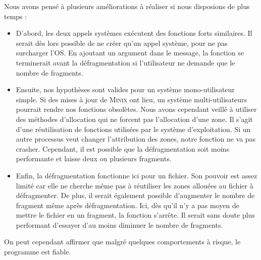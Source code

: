 Nous avons pensé à plusieurs améliorations à réaliser si nous disposions de plus temps : 
\begin{itemize}
\item D'abord, les deux appels systèmes exécutent des fonctions forts similaires. Il serait dès lors possible de ne créer qu'un appel système, pour ne pas surcharger l'OS. En ajoutant un argument dans le message, la fonction se terminerait avant la défragmentation si l'utilisateur ne demande que le nombre de fragments.
\item Ensuite, nos hypothèses sont valides pour un système mono-utilisateur simple. Si des mises à jour de \textsc{Minix} ont lieu, un système multi-utilisateurs pourrait rendre nos fonctions obsolètes. Nous avons cependant veillé à utiliser des méthodes d'allocation qui ne forcent pas l'allocation d'une zone. Il s'agit d'une réutilisation de fonctions utilisées par le système d'exploitation. Si un autre processus veut changer l'attribution des zones, notre fonction ne va pas crasher. Cependant, il est possible que la défragmentation soit moins performante et laisse deux ou plusieurs fragments.
\item Enfin, la défragmentation fonctionne ici pour un fichier. Son pouvoir est assez limité car elle ne cherche même pas à réutiliser les zones allouées au fichier à défragmenter. De plus, il serait également possible d'augmenter le nombre de fragment même après défragmentation. Ici, dès qu'il n'y a pas moyen de mettre le fichier en un fragment, la fonction s'arrête. Il serait sans doute plus performant d'essayer d'au moins diminuer le nombre de fragments.
\end{itemize}
On peut cependant affirmer que malgré quelques comportements à risque, le programme est fiable.